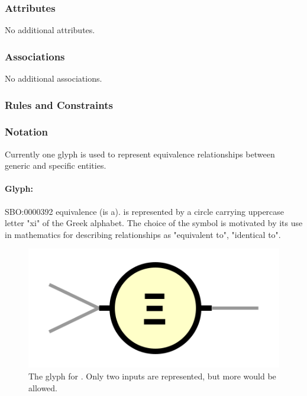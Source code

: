 \subsubsection{Attributes}

No additional attributes.

\subsubsection{Associations}

No additional associations.

\subsubsection{Rules and Constraints}

\begin{valrules}
\end{valrules}

\subsubsection{Notation}

Currently one glyph is used to represent equivalence relationships between generic and specific entities.

\paragraph{Glyph: }\label{sec:techref:equivalence}

\begin{glyphDescription}
 \glyphSboTerm SBO:0000392 equivalence (is a).
 \glyphNode {} is represented by a circle carrying uppercase letter "xi" of the Greek alphabet. The choice of the symbol is motivated by its use in mathematics for describing relationships as "equivalent to", "identical to". 
\end{glyphDescription}

\begin{figure}[htb]
  \centering
  \includegraphics[scale = 0.5]{images/equivalence}
  \caption{The \PD glyph for . Only two inputs are represented, but more would be allowed.}
  \label{fig:techref:equivalence}
\end{figure}

